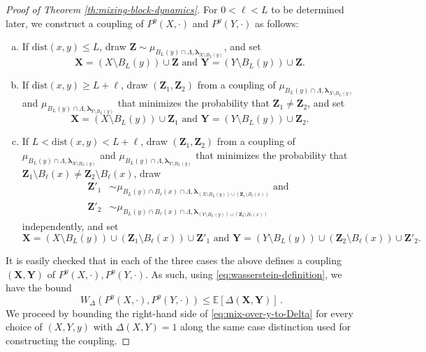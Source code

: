 \documentclass[10pt]{amsart}
\theoremstyle{definition}
\theoremstyle{remark}
\newcommand{\bX}{\mathbf{X}}
\newcommand{\bY}{\mathbf{Y}}
\newcommand{\bZ}{\mathbf{Z}}
\newcommand{\dist}{\mathrm{dist}}
\newcommand{\E}{\mathbb{E}}
\newcommand{\region}{\Lambda}
\newcommand{\activities}{\pmb{\lambda}}
\begin{document}
\begin{proof}[Proof of Theorem \ref{th:mixing-block-dynamics}]
		For $0 < \ell < L$ to be determined later, we construct a coupling of $P^{y}(X, \cdot)$ and $P^{y}(Y, \cdot)$ as follows:
		\begin{enumerate}[(a)] 
			\item \label{it:PC-case-1}If $\dist(x, y) \le L$, draw $\bZ \sim \mu_{B_L(y) \cap \region, \activities_{X \setminus B_L(y)}}$, and set 
			\[
			\bX = (X \setminus B_L(y)) \cup \bZ \text{ and }\bY = (Y \setminus B_L(y)) \cup \bZ.
			\]
			\item \label{it:PC-case-2} If $\dist(x, y) \ge L + \ell$, draw $(\bZ_1, \bZ_2)$ from a coupling of $\mu_{B_L(y) \cap \region, \activities_{X \setminus B_L(y)}}$ and $\mu_{B_L(y) \cap \region, \activities_{Y \setminus B_L(y)}}$ that minimizes the probability that $\bZ_1 \neq \bZ_2$, and set 
			\[
			\bX = (X \setminus B_L(y)) \cup \bZ_1 \text{ and } \bY = (Y \setminus B_L(y)) \cup \bZ_2.
			\]
			\item \label{it:PC-case-3} If $L < \dist(x, y) < L+\ell$, draw $(\bZ_1, \bZ_2)$ from a coupling of $\mu_{B_L(y) \cap \region, \activities_{X \setminus B_L(y)}}$ and $\mu_{B_L(y) \cap \region, \activities_{Y \setminus B_L(y)}}$ that minimizes the probability that $\bZ_1 \setminus B_{\ell}(x) \neq \bZ_2 \setminus B_{\ell}(x)$, draw 
			\begin{align*}
				\bZ'_1 &\sim \mu_{B_L(y) \cap B_{\ell}(x) \cap \region, \activities_{(X \setminus B_L(y)) \cup (\bZ_1 \setminus B_{\ell}(x))}} \text{ and }\\
				\bZ'_2 &\sim \mu_{B_L(y) \cap B_{\ell}(x) \cap \region, \activities_{(Y \setminus B_L(y)) \cup (\bZ_2 \setminus B_{\ell}(x))}} 
			\end{align*}
			independently, and set
			\[
			\bX = (X \setminus B_L(y)) \cup (\bZ_1 \setminus B_{\ell}(x)) \cup \bZ'_1 \text{ and } \bY = (Y \setminus B_L(y)) \cup (\bZ_2 \setminus B_{\ell}(x)) \cup \bZ'_2.
			\]
		\end{enumerate}
		It is easily checked that in each of the three cases the above defines a coupling $(\bX,\bY)$ of $P^{y}(X,\cdot),P^{y}(Y,\cdot).$  
		As such, using \eqref{eq:wasserstein-definition}, we have the bound 
		\begin{equation} \label{eq:mix-over-y-to-Delta}
			W_\Delta(P^{y}(X,\cdot),P^{y}(Y,\cdot)) \leq \E[\Delta(\bX,\bY)] \,.
		\end{equation}
		We proceed by bounding the right-hand side of \eqref{eq:mix-over-y-to-Delta} for every choice of $(X, Y, y)$ with $\Delta(X, Y) = 1$ along the same case distinction used for constructing the coupling.
		

\end{proof}
\end{document}
